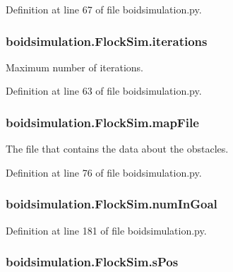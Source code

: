 Definition at line 67 of file boidsimulation.\-py.

\hypertarget{classboidsimulation_1_1FlockSim_a1febd4cacbdcffb5b9d096d4716af78f}{
\subsubsection[{iterations}]{\setlength{\rightskip}{0pt plus 5cm}boidsimulation.\-Flock\-Sim.\-iterations}}\label{classboidsimulation_1_1FlockSim_a1febd4cacbdcffb5b9d096d4716af78f}


Maximum number of iterations. 



Definition at line 63 of file boidsimulation.\-py.

\hypertarget{classboidsimulation_1_1FlockSim_a50b375f7caa0e33d87141d2cde14526f}{
\subsubsection[{map\-File}]{\setlength{\rightskip}{0pt plus 5cm}boidsimulation.\-Flock\-Sim.\-map\-File}}\label{classboidsimulation_1_1FlockSim_a50b375f7caa0e33d87141d2cde14526f}


The file that contains the data about the obstacles. 



Definition at line 76 of file boidsimulation.\-py.

\hypertarget{classboidsimulation_1_1FlockSim_ae60982002b6c8c922b3822dbdec4bd41}{
\subsubsection[{num\-In\-Goal}]{\setlength{\rightskip}{0pt plus 5cm}boidsimulation.\-Flock\-Sim.\-num\-In\-Goal}}\label{classboidsimulation_1_1FlockSim_ae60982002b6c8c922b3822dbdec4bd41}


Definition at line 181 of file boidsimulation.\-py.

\hypertarget{classboidsimulation_1_1FlockSim_a1658c675990b8bdb3955cae1b7292b38}{
\subsubsection[{s\-Pos}]{\setlength{\rightskip}{0pt plus 5cm}boidsimulation.\-Flock\-Sim.\-s\-Pos}}\label{classboidsimulation_1_1FlockSim_a1658c675990b8bdb3955cae1b7292b38}



